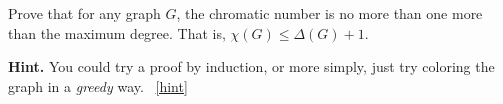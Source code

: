 \documentclass{book}
\begin{document}
\setcounter{project}{45}
\addtocounter{project}{-1}
\begin{activity}[]\label{activity-38}
\hypertarget{p-417}{}%
Prove that for any graph \(G\), the chromatic number is no more than one more than the maximum degree.  That is, \(\chi(G) \le \Delta(G) + 1\).%
\par\smallskip%
\noindent\textbf{Hint.}\hypertarget{hint-19}{}\quad%
\hypertarget{p-418}{}%
You could try a proof by induction, or more simply, just try coloring the graph in a \emph{greedy} way.%
~\hfill{\tiny\hyperlink{a-45}{[hint]}\hypertarget{q-45}{}}\end{activity}
\end{document}
